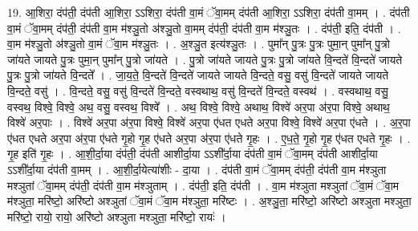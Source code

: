 \documentclass[17pt]{extarticle}
\begin{document}
19. आ॒शिरा॒ दंप॑ती॒ दंप॑ती आ॒शिरा॒ ऽऽशिरा॒ दंप॑ती वा॒मं ॅवा॒मम् दंप॑ती आ॒शिरा॒ ऽऽशिरा॒ दंप॑ती वा॒मम् । . दंप॑ती वा॒मं ॅवा॒मम् दंप॑ती॒ दंप॑ती वा॒म म॑श्ञु॒तो अ॑श्ञु॒तो वा॒मम् दंप॑ती॒ दंप॑ती वा॒म म॑श्ञु॒तः । . दंप॑ती॒ इति॒ दंप॑ती । . वा॒म म॑श्ञु॒तो अ॑श्ञु॒तो वा॒मं ॅवा॒म म॑श्ञु॒तः । . अ॒श्ञु॒त इत्य॑श्ञु॒तः । . पुमा᳚न् पु॒त्रः पु॒त्रः पुमा॒न् पुमा᳚न् पु॒त्रो जा॑यते जायते पु॒त्रः पुमा॒न् पुमा᳚न् पु॒त्रो जा॑यते । . पु॒त्रो जा॑यते जायते पु॒त्रः पु॒त्रो जा॑यते वि॒न्दते॑ वि॒न्दते॑ जायते पु॒त्रः पु॒त्रो जा॑यते वि॒न्दते᳚ । . जा॒य॒ते॒ वि॒न्दते॑ वि॒न्दते॑ जायते जायते वि॒न्दते॒ वसु॒ वसु॑ वि॒न्दते॑ जायते जायते वि॒न्दते॒ वसु॑ । . वि॒न्दते॒ वसु॒ वसु॑ वि॒न्दते॑ वि॒न्दते॒ वस्वथाथ॒ वसु॑ वि॒न्दते॑ वि॒न्दते॒ वस्वथ॑ । . वस्वथाथ॒ वसु॒ वस्वथ॒ विश्वे॒ विश्वे॒ अथ॒ वसु॒ वस्वथ॒ विश्वे᳚ । . अथ॒ विश्वे॒ विश्वे॒ अथाथ॒ विश्वे॑ अर॒पा अ॑र॒पा विश्वे॒ अथाथ॒ विश्वे॑ अर॒पाः । . विश्वे॑ अर॒पा अ॑र॒पा विश्वे॒ विश्वे॑ अर॒पा ए॑धत एधते अर॒पा विश्वे॒ विश्वे॑ अर॒पा ए॑धते । . अ॒र॒पा ए॑धत एधते अर॒पा अ॑र॒पा ए॑धते गृ॒हो गृ॒ह ए॑धते अर॒पा अ॑र॒पा ए॑धते गृ॒हः । . ए॒ध॒ते॒ गृ॒हो गृ॒ह ए॑धत एधते गृ॒हः । . गृ॒ह इति॑ गृ॒हः । . आ॒शी॒र्दा॒या दंप॑ती॒ दंप॑ती आशीर्दा॒या ऽऽशी᳚र्दा॒या दंप॑ती वा॒मं ॅवा॒मम् दंप॑ती आशीर्दा॒या ऽऽशी᳚र्दा॒या दंप॑ती वा॒मम् । . आ॒शी॒र्दा॒येत्या॑शीः - दा॒या । . दंप॑ती वा॒मं ॅवा॒मम् दंप॑ती॒ दंप॑ती वा॒म म॑श्ञुता मश्ञुतां ॅवा॒मम् दंप॑ती॒ दंप॑ती वा॒म म॑श्ञुताम् । . दंप॑ती॒ इति॒ दंप॑ती । . वा॒म म॑श्ञुता मश्ञुतां ॅवा॒मं ॅवा॒म म॑श्ञुता॒ मरि॑ष्टो॒ अरि॑ष्टो अश्ञुतां ॅवा॒मं ॅवा॒म म॑श्ञुता॒ मरि॑ष्टः । . अ॒श्ञु॒ता॒ मरि॑ष्टो॒ अरि॑ष्टो अश्ञुता मश्ञुता॒ मरि॑ष्टो॒ रायो॒ रायो॒ अरि॑ष्टो अश्ञुता मश्ञुता॒ मरि॑ष्टो॒ रायः॑ । \newline
\end{document}
